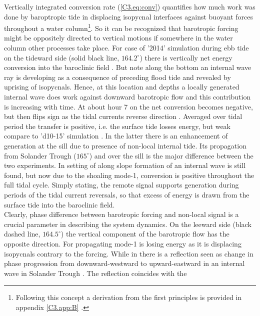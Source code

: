 \documentclass[12pt]{article}
\begin{document}
Vertically integrated conversion rate (\ref{C3.eq:conv}) quantifies how much work was done by 
baroptropic tide in displacing isopycnal interfaces against buoyant forces throughout a water 
column\footnote{Following this concept a derivation from the first principles is provided in 
appendix 
\ref{C3.app:B} \citep{kurapov2003m, kelly2010topo}.}. So it can be recognized 
that 
barotropic forcing might be oppositely directed to vertical motions if somewhere in the 
water column other processes take place. For case of '2014' simulation  
during ebb tide on the tideward side (solid black line, $164.2^{\circ}$) there is vertically net 
energy 
conversion into the baroclinic field . But note along the bottom an 
internal wave ray is developing as a consequence of preceding flood tide and revealed by uprising 
of isopycnals. 
Hence, at this location and depths a locally generated internal wave does work against 
downward barotropic flow and this contribution is increasing with time. At about hour 7 on 
 the net conversion becomes negative, but then flips sign as the 
tidal currents reverse direction . Averaged over tidal period the 
transfer is positive, i.e. the surface tide losses energy, but weak compare to 'd10-15' simulation 
. In the latter there is an enhancement of generation at the sill due 
to presence of non-local internal tide. Its propagation from Solander Trough ($165^{\circ}$) and 
over the sill is the major difference between the two experiments. In setting of  
along slope formation of an internal wave is still found, but now due to the shoaling 
mode-1, conversion is positive throughout the full tidal cycle. Simply stating, the remote signal 
supports 
generation during periods of the tidal current reversals, so that excess of energy is drawn from 
the surface tide into the baroclinic field.\\
Clearly, phase difference between barotropic forcing and non-local signal is a crucial parameter 
in describing the system dynamics. On the leeward side (black dashed line, $164.5^{\circ}$) the 
vertical 
component of the barotropic flow has the opposite direction. For  propagating mode-1 is 
losing energy as it is displacing isopycnals contrary to the forcing. While in  there is 
a reflection seen as change in phase progression from downward-westward to upward-eastward in an 
internal wave in Solander Trough . The reflection coincides with the 
\end{document}
